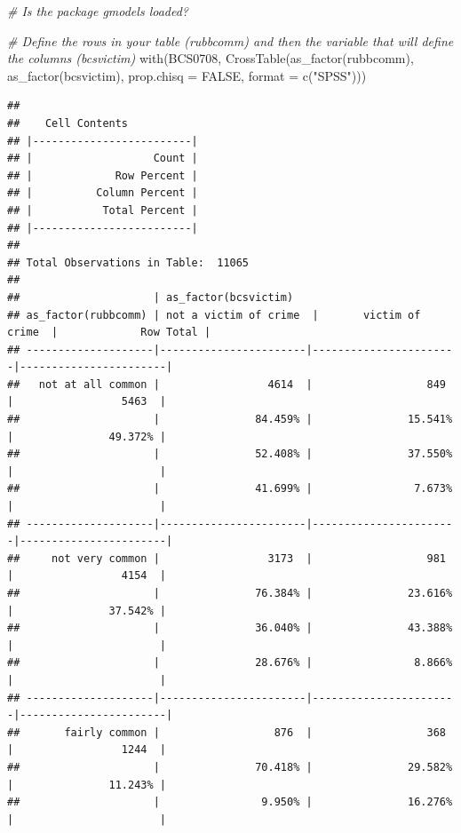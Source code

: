 \documentclass[
]{book}
\newenvironment{Shaded}{\begin{snugshade}}{\end{snugshade}}
\newcommand{\AttributeTok}[1]{\textcolor[rgb]{0.77,0.63,0.00}{#1}}
\newcommand{\CommentTok}[1]{\textcolor[rgb]{0.56,0.35,0.01}{\textit{#1}}}
\newcommand{\ConstantTok}[1]{\textcolor[rgb]{0.00,0.00,0.00}{#1}}
\newcommand{\FunctionTok}[1]{\textcolor[rgb]{0.00,0.00,0.00}{#1}}
\newcommand{\NormalTok}[1]{#1}
\newcommand{\StringTok}[1]{\textcolor[rgb]{0.31,0.60,0.02}{#1}}
\begin{document}
\begin{Shaded}
\begin{Highlighting}[]
\CommentTok{\# Is the package \textasciigrave{}gmodels\textasciigrave{} loaded?}

\CommentTok{\# Define the rows in your table (rubbcomm) and then the variable that will define the columns (bcsvictim)}
\FunctionTok{with}\NormalTok{(BCS0708, }\FunctionTok{CrossTable}\NormalTok{(}\FunctionTok{as\_factor}\NormalTok{(rubbcomm), }
                         \FunctionTok{as\_factor}\NormalTok{(bcsvictim), }\AttributeTok{prop.chisq =} \ConstantTok{FALSE}\NormalTok{, }\AttributeTok{format =} \FunctionTok{c}\NormalTok{(}\StringTok{"SPSS"}\NormalTok{)))}
\end{Highlighting}
\end{Shaded}

\begin{verbatim}
## 
##    Cell Contents
## |-------------------------|
## |                   Count |
## |             Row Percent |
## |          Column Percent |
## |           Total Percent |
## |-------------------------|
## 
## Total Observations in Table:  11065 
## 
##                     | as_factor(bcsvictim) 
## as_factor(rubbcomm) | not a victim of crime  |       victim of crime  |             Row Total | 
## --------------------|-----------------------|-----------------------|-----------------------|
##   not at all common |                 4614  |                  849  |                 5463  | 
##                     |               84.459% |               15.541% |               49.372% | 
##                     |               52.408% |               37.550% |                       | 
##                     |               41.699% |                7.673% |                       | 
## --------------------|-----------------------|-----------------------|-----------------------|
##     not very common |                 3173  |                  981  |                 4154  | 
##                     |               76.384% |               23.616% |               37.542% | 
##                     |               36.040% |               43.388% |                       | 
##                     |               28.676% |                8.866% |                       | 
## --------------------|-----------------------|-----------------------|-----------------------|
##       fairly common |                  876  |                  368  |                 1244  | 
##                     |               70.418% |               29.582% |               11.243% | 
##                     |                9.950% |               16.276% |                       | 

\end{verbatim}
\end{document}
